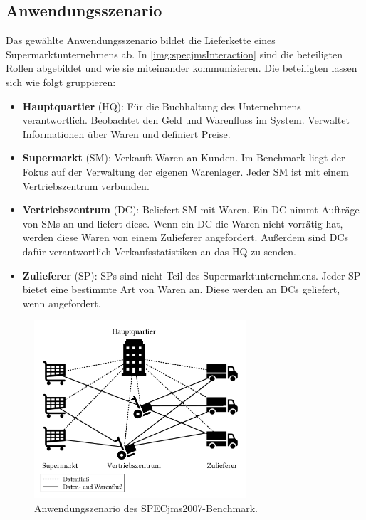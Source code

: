 \subsection{Anwendungsszenario}
Das gewählte Anwendungsszenario bildet die Lieferkette eines Supermarktunternehmens ab. In \autoref{img:specjmsInteraction} sind die beteiligten Rollen abgebildet und wie sie miteinander kommunizieren. Die beteiligten lassen sich wie folgt gruppieren: 
\begin{itemize}
    \item \textbf{Hauptquartier} (HQ): Für die Buchhaltung des Unternehmens verantwortlich. Beobachtet den Geld und Warenfluss im System. Verwaltet Informationen über Waren und definiert Preise.
    \item \textbf{Supermarkt} (SM): Verkauft Waren an Kunden. Im Benchmark liegt der Fokus auf der Verwaltung der eigenen Warenlager. Jeder SM ist mit einem Vertriebszentrum verbunden.
    \item \textbf{Vertriebszentrum} (DC): Beliefert SM mit Waren. Ein DC nimmt Aufträge von SMs an und liefert diese. Wenn ein DC die Waren nicht vorrätig hat, werden diese Waren von einem Zulieferer angefordert. Außerdem sind DCs dafür verantwortlich Verkaufsstatistiken an das HQ zu senden.
    \item \textbf{Zulieferer} (SP): SPs sind nicht Teil des Supermarktunternehmens. Jeder SP bietet eine bestimmte Art von Waren an. Diese werden an DCs geliefert, wenn angefordert.
\end{itemize}

\begin{figure}
\center
  \includegraphics[width=0.7\textwidth]{images/evaluation/specjms/specjmsOverview.pdf}
  \caption{Anwendungszenario des SPECjms2007-Benchmark.}
  \label{img:specjmsInteraction}
\end{figure}

